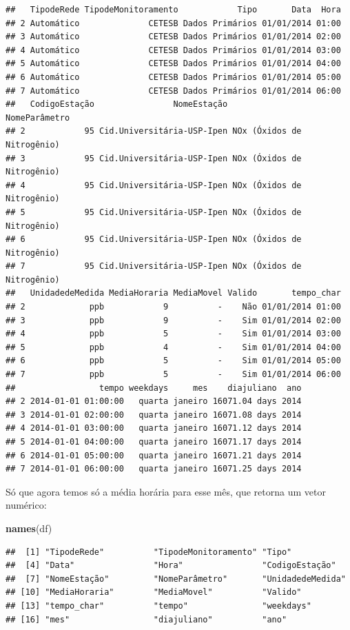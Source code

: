 \documentclass[]{book}
\newenvironment{Shaded}{\begin{snugshade}}{\end{snugshade}}
\newcommand{\KeywordTok}[1]{\textcolor[rgb]{0.13,0.29,0.53}{\textbf{#1}}}
\newcommand{\NormalTok}[1]{#1}
\theoremstyle{definition}
\theoremstyle{definition}
\theoremstyle{definition}
\theoremstyle{remark}
\begin{document}
\begin{verbatim}
##   TipodeRede TipodeMonitoramento            Tipo       Data  Hora
## 2 Automático              CETESB Dados Primários 01/01/2014 01:00
## 3 Automático              CETESB Dados Primários 01/01/2014 02:00
## 4 Automático              CETESB Dados Primários 01/01/2014 03:00
## 5 Automático              CETESB Dados Primários 01/01/2014 04:00
## 6 Automático              CETESB Dados Primários 01/01/2014 05:00
## 7 Automático              CETESB Dados Primários 01/01/2014 06:00
##   CodigoEstação                NomeEstação              NomeParâmetro
## 2            95 Cid.Universitária-USP-Ipen NOx (Óxidos de Nitrogênio)
## 3            95 Cid.Universitária-USP-Ipen NOx (Óxidos de Nitrogênio)
## 4            95 Cid.Universitária-USP-Ipen NOx (Óxidos de Nitrogênio)
## 5            95 Cid.Universitária-USP-Ipen NOx (Óxidos de Nitrogênio)
## 6            95 Cid.Universitária-USP-Ipen NOx (Óxidos de Nitrogênio)
## 7            95 Cid.Universitária-USP-Ipen NOx (Óxidos de Nitrogênio)
##   UnidadedeMedida MediaHoraria MediaMovel Valido       tempo_char
## 2             ppb            9          -    Não 01/01/2014 01:00
## 3             ppb            9          -    Sim 01/01/2014 02:00
## 4             ppb            5          -    Sim 01/01/2014 03:00
## 5             ppb            4          -    Sim 01/01/2014 04:00
## 6             ppb            5          -    Sim 01/01/2014 05:00
## 7             ppb            5          -    Sim 01/01/2014 06:00
##                 tempo weekdays     mes    diajuliano  ano
## 2 2014-01-01 01:00:00   quarta janeiro 16071.04 days 2014
## 3 2014-01-01 02:00:00   quarta janeiro 16071.08 days 2014
## 4 2014-01-01 03:00:00   quarta janeiro 16071.12 days 2014
## 5 2014-01-01 04:00:00   quarta janeiro 16071.17 days 2014
## 6 2014-01-01 05:00:00   quarta janeiro 16071.21 days 2014
## 7 2014-01-01 06:00:00   quarta janeiro 16071.25 days 2014
\end{verbatim}

Só que agora temos só a média horária para esse mês, que retorna um
vetor numérico:

\begin{Shaded}
\begin{Highlighting}[]
\KeywordTok{names}\NormalTok{(df)}
\end{Highlighting}
\end{Shaded}

\begin{verbatim}
##  [1] "TipodeRede"          "TipodeMonitoramento" "Tipo"               
##  [4] "Data"                "Hora"                "CodigoEstação"      
##  [7] "NomeEstação"         "NomeParâmetro"       "UnidadedeMedida"    
## [10] "MediaHoraria"        "MediaMovel"          "Valido"             
## [13] "tempo_char"          "tempo"               "weekdays"           
## [16] "mes"                 "diajuliano"          "ano"
\end{verbatim}
\end{document}
